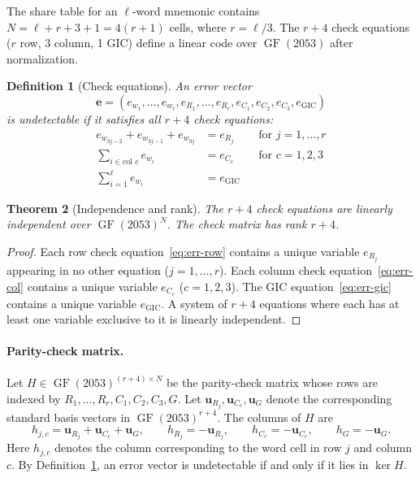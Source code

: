 \documentclass[11pt]{article}
\newcommand{\GF}{\operatorname{GF}}
\newtheorem{theorem}{Theorem}[subsection]
\newtheorem{definition}[theorem]{Definition}
\begin{document}
The share table for an $\ell$-word mnemonic contains $N = \ell + r + 3 + 1 = 4(r+1)$ cells, where $r = \ell/3$. The $r + 4$ check equations ($r$ row, 3 column, 1 GIC) define a linear code over $\GF(2053)$ after normalization.

\begin{definition}[Check equations]
\label{def:checks}
An error vector
\[
    \mathbf{e} = (e_{w_1}, \ldots, e_{w_\ell},\allowbreak e_{R_1}, \ldots, e_{R_r},\allowbreak e_{C_1}, e_{C_2}, e_{C_3},\allowbreak e_{\text{GIC}})
\]
is \emph{undetectable} if it satisfies all $r + 4$ check equations:
\begin{align}
    e_{w_{3j-2}} + e_{w_{3j-1}} + e_{w_{3j}} &= e_{R_j} && \text{for } j = 1, \ldots, r \label{eq:err-row} \\
    \sum_{i \in \text{col } c} e_{w_i} &= e_{C_c} && \text{for } c = 1, 2, 3 \label{eq:err-col} \\
    \sum_{i=1}^{\ell} e_{w_i} &= e_{\text{GIC}} \label{eq:err-gic}
\end{align}
\end{definition}

\begin{theorem}[Independence and rank]
\label{thm:rank}
The $r + 4$ check equations are linearly independent over $\GF(2053)^N$. The check matrix has rank $r + 4$.
\end{theorem}

\begin{proof}
Each row check equation~\eqref{eq:err-row} contains a unique variable $e_{R_j}$ appearing in no other equation ($j = 1, \ldots, r$). Each column check equation~\eqref{eq:err-col} contains a unique variable $e_{C_c}$ ($c = 1, 2, 3$). The GIC equation~\eqref{eq:err-gic} contains a unique variable $e_{\text{GIC}}$. A system of $r + 4$ equations where each has at least one variable exclusive to it is linearly independent.
\end{proof}

\paragraph{Parity-check matrix.}
Let $H \in \GF(2053)^{(r+4) \times N}$ be the parity-check matrix whose rows are indexed by $R_1, \ldots, R_r, C_1, C_2, C_3, G$. Let $\mathbf{u}_{R_j}, \mathbf{u}_{C_c}, \mathbf{u}_G$ denote the corresponding standard basis vectors in $\GF(2053)^{r+4}$. The columns of $H$ are
\[
    h_{j,c} = \mathbf{u}_{R_j} + \mathbf{u}_{C_c} + \mathbf{u}_G,\qquad
    h_{R_j} = -\mathbf{u}_{R_j},\qquad
    h_{C_c} = -\mathbf{u}_{C_c},\qquad
    h_G = -\mathbf{u}_G.
\]
Here $h_{j,c}$ denotes the column corresponding to the word cell in row $j$ and column $c$. By Definition~\ref{def:checks}, an error vector is undetectable if and only if it lies in $\ker H$.
\end{document}
